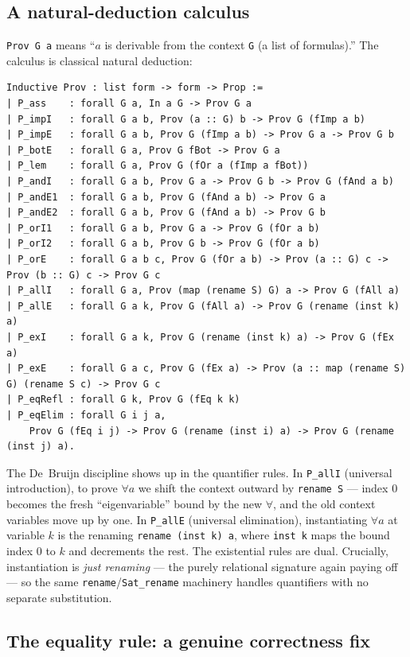 \documentclass[11pt]{article}
\theoremstyle{plain}
\theoremstyle{definition}
\newcommand{\cq}[1]{\lstinline[basicstyle=\ttfamily]|#1|}
\begin{document}
\subsection{A natural-deduction calculus}

\cq{Prov G a} means ``$a$ is derivable from the context \cq{G} (a list of
formulas).'' The calculus is classical natural deduction:

\begin{lstlisting}
Inductive Prov : list form -> form -> Prop :=
| P_ass    : forall G a, In a G -> Prov G a
| P_impI   : forall G a b, Prov (a :: G) b -> Prov G (fImp a b)
| P_impE   : forall G a b, Prov G (fImp a b) -> Prov G a -> Prov G b
| P_botE   : forall G a, Prov G fBot -> Prov G a
| P_lem    : forall G a, Prov G (fOr a (fImp a fBot))
| P_andI   : forall G a b, Prov G a -> Prov G b -> Prov G (fAnd a b)
| P_andE1  : forall G a b, Prov G (fAnd a b) -> Prov G a
| P_andE2  : forall G a b, Prov G (fAnd a b) -> Prov G b
| P_orI1   : forall G a b, Prov G a -> Prov G (fOr a b)
| P_orI2   : forall G a b, Prov G b -> Prov G (fOr a b)
| P_orE    : forall G a b c, Prov G (fOr a b) -> Prov (a :: G) c -> Prov (b :: G) c -> Prov G c
| P_allI   : forall G a, Prov (map (rename S) G) a -> Prov G (fAll a)
| P_allE   : forall G a k, Prov G (fAll a) -> Prov G (rename (inst k) a)
| P_exI    : forall G a k, Prov G (rename (inst k) a) -> Prov G (fEx a)
| P_exE    : forall G a c, Prov G (fEx a) -> Prov (a :: map (rename S) G) (rename S c) -> Prov G c
| P_eqRefl : forall G k, Prov G (fEq k k)
| P_eqElim : forall G i j a,
    Prov G (fEq i j) -> Prov G (rename (inst i) a) -> Prov G (rename (inst j) a).
\end{lstlisting}

The De~Bruijn discipline shows up in the quantifier rules. In \cq{P_allI}
(universal introduction), to prove $\forall a$ we shift the context outward by
\cq{rename S} --- index $0$ becomes the fresh ``eigenvariable'' bound by the new
$\forall$, and the old context variables move up by one. In \cq{P_allE} (universal
elimination), instantiating $\forall a$ at variable $k$ is the renaming
\cq{rename (inst k) a}, where \cq{inst k} maps the bound index $0$ to $k$ and
decrements the rest. The existential rules are dual. Crucially, instantiation is
\emph{just renaming} --- the purely relational signature again paying off ---
so the same \cq{rename}/\cq{Sat_rename} machinery handles quantifiers with no
separate substitution.

\subsection{The equality rule: a genuine correctness fix}
\end{document}
